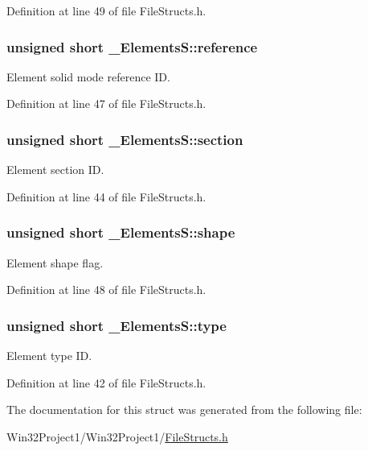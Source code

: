 Definition at line 49 of file File\+Structs.\+h.

\subsubsection[{\texorpdfstring{reference}{reference}}]{\setlength{\rightskip}{0pt plus 5cm}unsigned short \+\_\+\+Elements\+S\+::reference}\hypertarget{struct___elements_s_af9fa947d626f4bcdcb030fe4fab611c4}{}\label{struct___elements_s_af9fa947d626f4bcdcb030fe4fab611c4}


Element solid mode reference ID. 



Definition at line 47 of file File\+Structs.\+h.

\subsubsection[{\texorpdfstring{section}{section}}]{\setlength{\rightskip}{0pt plus 5cm}unsigned short \+\_\+\+Elements\+S\+::section}\hypertarget{struct___elements_s_a76160d7f046c6435586e878eb1ec93b4}{}\label{struct___elements_s_a76160d7f046c6435586e878eb1ec93b4}


Element section ID. 



Definition at line 44 of file File\+Structs.\+h.

\subsubsection[{\texorpdfstring{shape}{shape}}]{\setlength{\rightskip}{0pt plus 5cm}unsigned short \+\_\+\+Elements\+S\+::shape}\hypertarget{struct___elements_s_aff93e58a2996c7dcae7441a7d6804da0}{}\label{struct___elements_s_aff93e58a2996c7dcae7441a7d6804da0}


Element shape flag. 



Definition at line 48 of file File\+Structs.\+h.

\subsubsection[{\texorpdfstring{type}{type}}]{\setlength{\rightskip}{0pt plus 5cm}unsigned short \+\_\+\+Elements\+S\+::type}\hypertarget{struct___elements_s_ac4a61d8b7016a4a60a6e9f9b90904a93}{}\label{struct___elements_s_ac4a61d8b7016a4a60a6e9f9b90904a93}


Element type ID. 



Definition at line 42 of file File\+Structs.\+h.



The documentation for this struct was generated from the following file\+:\begin{DoxyCompactItemize}
\item 
Win32\+Project1/\+Win32\+Project1/\hyperlink{_file_structs_8h}{File\+Structs.\+h}\end{DoxyCompactItemize}
